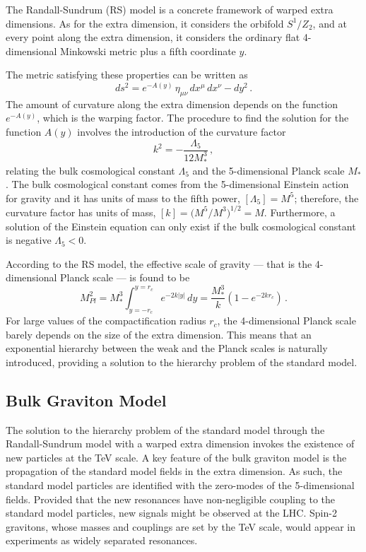 The Randall-Sundrum (RS) model \cite{Randall:1999ee,Randall:1999vf} is a concrete framework of warped extra dimensions. As for the extra dimension, it considers the orbifold $S^1/Z_2$, and at every point along the extra dimension, it considers the ordinary flat 4-dimensional Minkowski metric plus a fifth coordinate $y$. 

The metric satisfying these properties can be written as
\begin{equation}
ds^2 = e^{-A(y)} \, \eta_{\mu\nu} \, dx^\mu \, dx^\nu  - dy^2\,.
\end{equation}
The amount of curvature along the extra dimension depends on the function $e^{-A(y)}$, which is the warping factor. The procedure to find the solution for the function $A(y)$ involves the introduction of the curvature factor
\begin{equation}
k^2 = -\frac{\Lambda_5}{12 M^3_*}\,,
\end{equation}
relating the bulk cosmological constant $\Lambda_5$ and the 5-dimensional Planck scale $M_*$. The bulk cosmological constant \cite{Csaki:2004ay} comes from the 5-dimensional Einstein action for gravity and it has units of mass to the fifth power, $[\Lambda_5]=M^5$; therefore, the curvature factor has units of mass, $[k] = \big(M^5/M^3\big)^{1/2} = M$. Furthermore, a solution of the Einstein equation can only exist if the bulk cosmological constant is negative $\Lambda_5 < 0$. 

According to the RS model, the effective scale of gravity --- that is the 4-dimensional Planck scale --- is found to be
\begin{equation}
M^2_{Pl} = M^3_* \int_{y=-r_c}^{y=r_c} e^{-2k|y|} \, dy = \frac{M^3_*}{k} \left(1 - e^{-2kr_c} \right) \,.
\end{equation}
For large values of the compactification radius $r_c$, the 4-dimensional Planck scale barely depends on the size of the extra dimension. This means that an exponential hierarchy between the weak and the Planck scales is naturally introduced, providing a solution to the hierarchy problem of the standard model.

\subsection{Bulk Graviton Model}
The solution to the hierarchy problem of the standard model through the Randall-Sundrum model with a warped extra dimension  invokes the existence of new particles at the TeV scale. A key feature of the bulk graviton model \cite{Agashe:2007zd} is the propagation of the standard model fields in the extra dimension. As such, the standard model particles are identified with the zero-modes of the 5-dimensional fields. Provided that the new resonances have non-negligible coupling to the standard model particles, new signals might be observed at the LHC. Spin-2 gravitons, whose masses and couplings are set by the TeV scale, would appear in experiments as widely separated resonances. 

